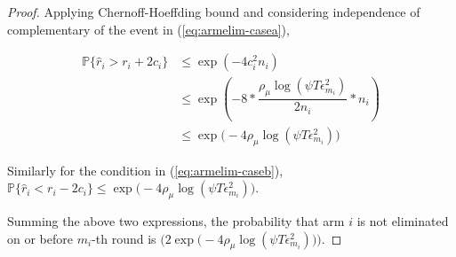 \begin{proof}
Applying Chernoff-Hoeffding bound and considering independence of complementary of the event in (\ref{eq:armelim-casea}),
\begin{small}
\begin{align*}
\mathbb{P}\lbrace\hat{r}_{i}> r_{i} + 2c_{i}\rbrace &\leq \exp(-4 c_{i}^{2}n_{i})\\
&\leq \exp(-8 * \dfrac{\rho_{\mu}\log (\psi T\epsilon_{m_{i}}^{2})}{2 n_{i}} *n_{i})\\
&\leq \exp\big(-4\rho_{\mu}\log (\psi T\epsilon_{m_{i}}^{2})\big)
\end{align*}
\end{small}
Similarly for the condition in (\ref{eq:armelim-caseb}), $\mathbb{P}\lbrace\hat{r}_{i}< r_{i} - 2c_{i}\rbrace\leq \exp\big(-4\rho_{\mu}\log (\psi T\epsilon_{m_{i}}^{2})\big)$.
 

Summing the above two expressions, the probability that arm ${i}$ is not eliminated on or before $m_{i}$-th round %
is $\big(2\exp\big(-4\rho_{\mu}\log (\psi T\epsilon_{m_{i}}^{2})\big)\big)$. 



\end{proof}
